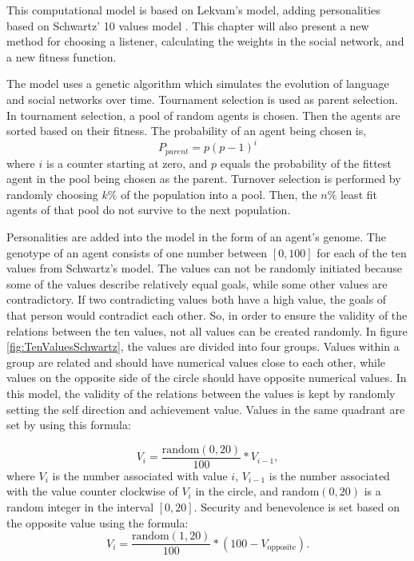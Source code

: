 This computational model is based on Lekvam’s model, adding personalities based on Schwartz' 10 values model \citep{lekvam2014co, schwartz2012overview}. This chapter will also present a new method for choosing a listener, calculating the weights in the social network, and a new fitness function.

The model uses a genetic algorithm which simulates the evolution of language and social networks over time. Tournament selection is used as parent selection. In tournament selection, a pool of random agents is chosen. Then the agents are sorted based on their fitness. The probability of an agent being chosen is,
\begin{equation}
    \label{eq:TSelect}
    P_{parent} = p(p-1)^{i}
\end{equation}
where $i$ is a counter starting at zero, and $p$ equals the probability of the fittest agent in the pool being chosen as the parent. Turnover selection is performed by randomly choosing $k\%$ of the population into a pool. Then, the $n\%$ least fit agents of that pool do not survive to the next population. 

Personalities are added into the model in the form of an agent’s genome. The genotype of an agent consists of one number between $[0, 100]$ for each of the ten values from Schwartz’s model. The values can not be randomly initiated because some of the values describe relatively equal goals, while some other values are contradictory. If two contradicting values both have a high value, the goals of that person would contradict each other. So, in order to ensure the validity of the relations between the ten values, not all values can be created randomly. In figure \ref{fig:TenValuesSchwartz}, the values are divided into four groups. Values within a group are related and should have numerical values close to each other, while values on the opposite side of the circle should have opposite numerical values. In this model, the validity of the relations between the values is kept by randomly setting the self direction and achievement value. Values in the same quadrant are set by using this formula:

\begin{equation}\label{eq:valuesInSameQuadrant}
V_{i} = \frac{\mathrm{random}(0, 20)}{100} \ast V_{i-1},
\end{equation}
where $V_{i}$ is the number associated with value $i$, $V_{i-1}$ is the number associated with the value counter clockwise of $V_i$ in the circle, and $\mathrm{random}(0, 20)$ is a random integer in the interval $[0, 20]$. Security and benevolence is set based on the opposite value using the formula:
\begin{equation}\label{eq:valuesInOppositeQuadrant}
V_{i} = \frac{\mathrm{random}(1, 20)}{100} \ast (100 - V_{\mathrm{opposite}}).
\end{equation}

